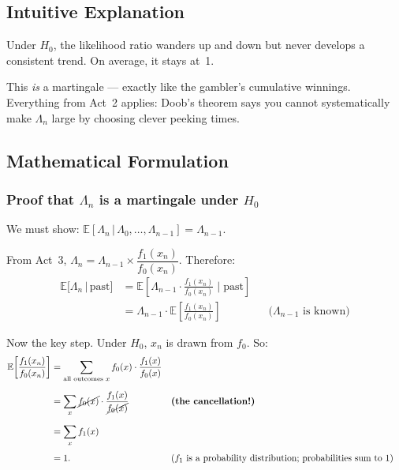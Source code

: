 \documentclass[12pt, a4paper]{article}
\newcommand{\E}{\mathbb{E}}            %
\newcommand{\given}{\,\vert\,}         %
\newcommand{\LR}{\Lambda}              %
\begin{document}
\subsection{Intuitive Explanation}

\begin{intuition}
Under $H_0$, the likelihood ratio wanders up and down but never develops a
consistent trend.  On average, it stays at~1.

This \emph{is} a martingale --- exactly like the gambler's cumulative winnings.
Everything from Act~2 applies: Doob's theorem says you cannot systematically
make $\LR_n$ large by choosing clever peeking times.
\end{intuition}

\subsection{Mathematical Formulation}

\subsubsection*{Proof that $\LR_n$ is a martingale under $H_0$}

We must show:
$\E[\LR_n \given \LR_0, \ldots, \LR_{n-1}] = \LR_{n-1}$.

From Act~3, $\LR_n = \LR_{n-1} \times \dfrac{f_1(x_n)}{f_0(x_n)}$.
Therefore:
\begin{align}
  \E\bigl[\LR_n \given \text{past}\bigr]
  &= \E\!\left[\LR_{n-1} \cdot \frac{f_1(x_n)}{f_0(x_n)} \;\bigg\vert\; \text{past}\right]
     \nonumber \\
  &= \LR_{n-1} \cdot \E\!\left[\frac{f_1(x_n)}{f_0(x_n)}\right]
     & &\text{($\LR_{n-1}$ is known)}
     \label{eq:lr-mart-step1}
\end{align}

Now the key step.  Under $H_0$, $x_n$ is drawn from $f_0$.  So:
\begin{align}
  \E\!\left[\frac{f_1(x_n)}{f_0(x_n)}\right]
  &= \sum_{\text{all outcomes } x} f_0(x) \cdot \frac{f_1(x)}{f_0(x)}
     \nonumber \\[6pt]
  &= \sum_x \cancel{f_0(x)} \cdot \frac{f_1(x)}{\cancel{f_0(x)}}
     & &\text{\textbf{(the cancellation!)}}
     \nonumber \\[6pt]
  &= \sum_x f_1(x)
     \nonumber \\[4pt]
  &= 1.
     & &\text{($f_1$ is a probability distribution; probabilities sum to~1)}
     \label{eq:lr-mart-cancel}
\end{align}
\end{document}
